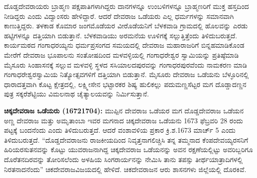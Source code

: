 ದೊಡ್ಡದೇವರಾಯರು ಬ್ರಾಹ್ಮಣ ಪಕ್ಷಪಾತಿಗಳಾಗಿದ್ದರು ದಾನಗಳನ್ನೂ ಉಂಬಳಿಗಳನ್ನೂ ಬ್ರಾಹ್ಮಣರಿಗೆ ಮುಕ್ತ ಹಸ್ತದಿಂದ ನೀಡಿದ್ದರು ಎಂದು ವಿದ್ವಾಂಸರು ಹೇಳಿದ್ದಾರೆ. ಆದರೆ ದೇವರಾಜ ಒಡೆಯರು ಎಲ್ಲ ಧರ್ಮಗಳನ್ನು ಸಮಾನವಾಗಿ ಕಾಣುತ್ತಿದ್ದರು. ತಳಕಾಡ ಕೊಮಾರ ಜಂಗಮೊಡೆಯರ ವೀರೊಡೆಯನಿಗೆ ಬೆಳಕವಾಡಿ ಗ್ರಾಮದಲ್ಲಿ ಹೊಲವನ್ನು ಎರಡು ಹಟ್ಟಿಗಳನ್ನೂ ದತ್ತಿಯಾಗಿ ಬಿಡುತ್ತಾನೆ. ಬೆಳಕವಾಡಿಯು ಅರಮನೆಯ ಊಳಿಗಕ್ಕೆ ಸಲ್ಲುತ್ತಿತ್ತೆಂದು ತಿಳಿದುಬರುತ್ತದೆ. ಕಾರ್ಯಮಠದ ಗಂಗಾಧರಯ್ಯನು ಧರ್ಮಪ್ರಸಂಗದ ಸಮಯದಲ್ಲಿ ದೇವರಾಜ ಮಹಾರಾಜರಿಗೆ ಬಿನ್ನಹಮಾಡಿಕೊಂಡ ಮೇರೆಗೆ ದೇವರಾಜ ಭೂಪಾಲನು ಸಂತೋಷದಿಂದ ಮಳವಳ್ಳಿಯಲ್ಲಿ ಗಂಗಾಧರೇಶ್ವರ ಸ್ವಾಮಿಯನ್ನು ಪ್ರತಿಷ್ಠೆಮಾಡಿ ಮೈಸೂರು ಸಿಂಹಾಸನಕ್ಕೆ ಸಲ್ಲುವ ಮಳವಳ್ಳಿ ಸ್ಥಳದ ಸಸಿಯಾಲದಪುರವನ್ನು ಗಂಗಾಧರಪುರವೆಂದು ನಾಮಕರಣ ಮಾಡಿ ಗಂಗಾಧರೇಶ್ವರ\-ಸ್ವಾಮಿಯ ನಿತ್ಯೋತ್ಸವಗಳಿಗೆ ದತ್ತಿಯಾಗಿ ಬಿಡುತ್ತಾನೆ. ಮೈಸೂರು ದೇವರಾಜ ಒಡೆಯನು ಬೆಳ್ಳೂರಿನಲ್ಲಿ ಧಾರಾದತ್ತವಾಗಿ ಕೊಟ್ಟ ಕ್ಷೇತ್ರದಲ್ಲಿ, ಲಕ್ಷ್ಮೀಸೇನ ಭಟ್ಟಾರಕರ ಶಿಷ್ಯ ಹುಲಿಕಲ್ಲು ಪದುಮಣ್ಣಸೆಟ್ಟರ ಮಗ ದೊಡ್ಡಾದಣ್ಣನ ಪುತ್ರ ಸಕ್ಕರೆಶೆಟ್ಟಿಯು ವಿಮಲನಾಥ ಚೈತ್ಯಾಲಯವನ್ನು ನಿರ್ಮಿಸುತ್ತಾನೆ.

\textbf{ಚಿಕ್ಕದೇವರಾಜ ಒಡೆಯರು (1672\general{\enginline{-}}1704):} ಮುಪ್ಪಿನ ದೇವರಾಜ ಒಡೆಯರ ಮಗ ದೊಡ್ಡದೇವರಾಜ ಒಡೆಯನ ಅಣ್ಣ ದೇವರಾಜ ಮತ್ತು ಅಮೃತಾಂಬಾ ಇವರ ಮಗನಾದ ಚಿಕ್ಕದೇವರಾಜ ಒಡೆಯನು 1673 ಫೆಬ್ರವರಿ 28 ರಂದು ಪಟ್ಟಕ್ಕೆ ಬಂದನೆಂದು ಎಂದು ತಿಳಿದುಬರುತ್ತದೆ. ಆದರೆ ವಂಶಾವಳಿಯ ಪ್ರಕಾರ ಕ್ರಿ.ಶ.1673 ಮಾರ್ಚ್ 5 ಎಂದು ತಿಳಿದುಬರುತ್ತದೆ. “ದೊಡ್ಡದೇವರಾಜನು ರಾಜಕೀಯದಿಂದ ನಿವೃತ್ತನಾಗಲಿಚ್ಚಿಸಿ ತನ್ನ ತಮ್ಮನಾದ ಕೆಂಪದೇವಯ್ಯರಸನಿಗೆ ಹಿರಿಯರಸುತನವನ್ನು ಕೊಟ್ಟು ಯುವರಾಜನಾಗಿದ್ದ ಚಿಕ್ಕದೇವರಾಜ ಒಡೆಯನನ್ನು ಅವನ ರಕ್ಷಣೆಯಲ್ಲಿಟ್ಟು ಅವರಿಬ್ಬರಿಗೂ ದೊರೆತನದಿರವನ್ನು ತೋರಿಸಲೆಂದು ಅಳಹಿಯ ಸಿಂಗರಾರ್ಯನನ್ನು ನೇಮಿಸಿ ತಾನು ತಪಸ್ಸು ತೀರ್ಥಯಾತ್ರಾದಿಗಳಲ್ಲಿ ನಿರತನಾದನೆಂದು” ಚಿಕದೇವರಾಜವಿಜಯದಲ್ಲಿ ಹೇಳಿದೆ. ಚಿಕದೇವರಾಜನ ಆರು ಶಾಸನಗಳು ಜಿಲ್ಲೆಯಲ್ಲಿ ದೊರಕಿವೆ.

\newpage

